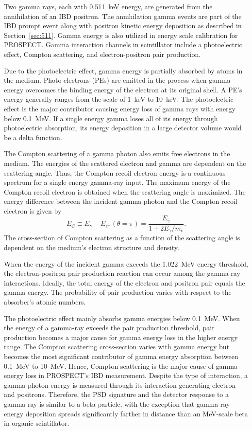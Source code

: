 Two gamma rays, each with 0.511~keV energy, are generated from the annihilation of an IBD positron.
The annihilation gamma events are part of the IBD prompt event along with positron kinetic energy deposition as described in Section~\ref{sec:511}.
Gamma energy is also utilized in energy scale calibration for PROSPECT.
Gamma interaction channels in scintillator include a photoelectric effect, Compton scattering, and electron-positron pair production.

Due to the photoelectric effect, gamma energy is partially absorbed by atoms in the medium.
Photo electrons (PEs) are emitted in the process when gamma energy overcomes the binding energy of the electron at its original shell. 
A PE's energy generally ranges from the scale of 1~keV to 10~keV.
The photoelectric effect is the major contributor causing energy loss of gamma rays with energy below 0.1~MeV.
If a single energy gamma loses all of its energy through photoelectric absorption, its energy deposition in a large detector volume would be a delta function.

The Compton scattering of a gamma photon also emits free electrons in the medium. 
The energies of the scattered electron and gamma are dependent on the scattering angle. 
Thus, the Compton recoil electron energy is a continuous spectrum for a single energy gamma-ray input.
The maximum energy of the Compton recoil electron is obtained when the scattering angle is maximized.
The energy difference between the incident gamma photon and the Compton recoil electron is given by
\begin{equation}
E_C \equiv E_\gamma  - E_{e^-} (\theta = \pi) = \frac{E_\gamma}{1+2E_\gamma/m_e}.
\end{equation}
The cross-section of Compton scattering as a function of the scattering angle is dependent on the medium's electron structure and density. 

When the energy of the incident gamma exceeds the 1.022~MeV energy threshold, the electron-positron pair production reaction can occur among the gamma ray interactions. 
Ideally, the total energy of the electron and positron pair equals the gamma energy.
The probability of pair production varies with respect to the absorber's atomic numbers.

The photoelectric effect mainly absorbs gamma energies below 0.1~MeV. 
When the energy of a gamma-ray exceeds the pair production threshold, pair production becomes a major cause for gamma energy loss in the higher energy range. 
The Compton scattering cross-section varies with gamma energy but becomes the most significant contributor of gamma energy absorption between 0.1~MeV to 10~MeV.
Hence, Compton scattering is the major cause of gamma energy loss in PROSPECT's IBD measurement.
Despite the type of interaction, a gamma photon energy is measured through its interaction generating electron and positrons.
Therefore, the PSD signature and the detector response to a gamma-ray is similar to a beta particle, with the exception that gamma-ray energy deposition spreads significantly farther in distance than an MeV-scale beta in organic scintillator.

